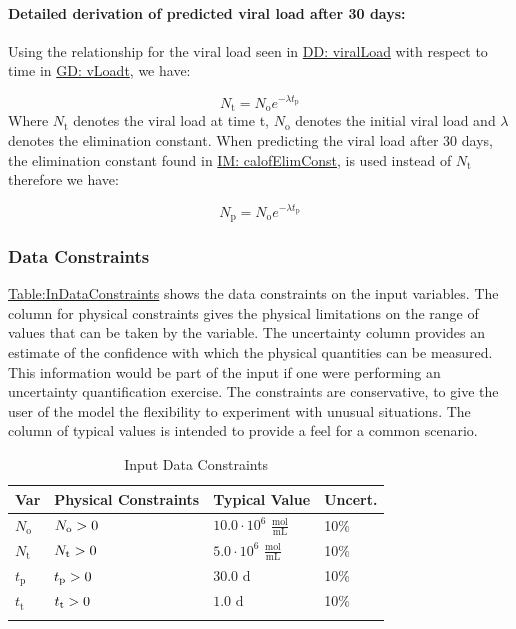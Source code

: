 \documentclass[12pt]{article}
\newcommand{\gt}{\ensuremath >}
\begin{document}
\paragraph{Detailed derivation of predicted viral load after 30 days:}
\label{IM:calofPredictedVLDeriv}
Using the relationship for the viral load seen in \hyperref[DD:viralLoad]{DD: viralLoad} with respect to time in \hyperref[GD:vLoadt]{GD: vLoadt}, we have:

\begin{displaymath}
{N_{\text{t}}}={N_{\text{o}}} e^{-λ {t_{\text{p}}}}
\end{displaymath}
Where ${N_{\text{t}}}$ denotes the viral load at time t, ${N_{\text{o}}}$ denotes the initial viral load and $λ$ denotes the elimination constant. When predicting the viral load after 30 days, the elimination constant  found in \hyperref[IM:calofElimConst]{IM: calofElimConst},  is used instead of ${N_{\text{t}}}$  therefore we have:

\begin{displaymath}
{N_{\text{p}}}={N_{\text{o}}} e^{-λ {t_{\text{p}}}}
\end{displaymath}
\subsubsection{Data Constraints}
\label{Sec:DataConstraints}
\hyperref[Table:InDataConstraints]{Table:InDataConstraints} shows the data constraints on the input variables. The column for physical constraints gives the physical limitations on the range of values that can be taken by the variable. The uncertainty column provides an estimate of the confidence with which the physical quantities can be measured. This information would be part of the input if one were performing an uncertainty quantification exercise. The constraints are conservative, to give the user of the model the flexibility to experiment with unusual situations. The column of typical values is intended to provide a feel for a common scenario.

\begin{longtable}{l l l l}
\toprule
\textbf{Var} & \textbf{Physical Constraints} & \textbf{Typical Value} & \textbf{Uncert.}
\\
\midrule
\endhead
${N_{\text{o}}}$ & ${N_{\text{o}}}\gt{}0$ & $10.0\cdot{}10^{6}$ $\frac{\text{mol}}{\text{mL}}$ & 10$\%$
\\
${N_{\text{t}}}$ & ${N_{\text{t}}}\gt{}0$ & $5.0\cdot{}10^{6}$ $\frac{\text{mol}}{\text{mL}}$ & 10$\%$
\\
${t_{\text{p}}}$ & ${t_{\text{p}}}\gt{}0$ & $30.0$ ${\text{d}}$ & 10$\%$
\\
${t_{\text{t}}}$ & ${t_{\text{t}}}\gt{}0$ & $1.0$ ${\text{d}}$ & 10$\%$
\\
\bottomrule
\caption{Input Data Constraints}
\label{Table:InDataConstraints}
\end{longtable}
\end{document}
